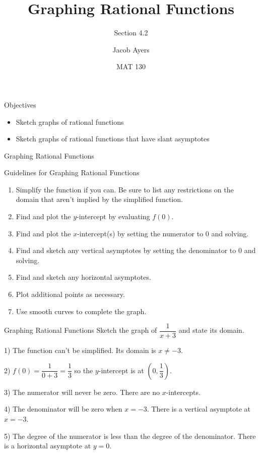 \documentclass[t, aspectratio=169]{beamer}
\title[4.2]{Graphing Rational Functions}
\subtitle{Section 4.2}
\author{Jacob Ayers}
\institute{Lesson \#16}
\date{MAT 130}
\newcommand{\fp}[1]{\left({#1}\right)} %
\begin{document}
	
	\begin{frame}
		\titlepage
	\end{frame}
	
	\begin{frame}{Objectives}
		\begin{itemize}
			\item Sketch graphs of rational functions
			\item Sketch graphs of rational functions that have slant asymptotes
		\end{itemize}
	\end{frame}
	
	\begin{frame}{Graphing Rational Functions}
		\begin{block}{Guidelines for Graphing Rational Functions}
			\begin{enumerate}[1)]
				\item Simplify the function if you can. Be sure to list any restrictions on the domain that aren't implied by the simplified function. \pause
				\item Find and plot the $y$-intercept by evaluating $f(0)$. \pause
				\item Find and plot the $x$-intercept(s) by setting the numerator to $0$ and solving. \pause
				\item Find and sketch any vertical asymptotes by setting the denominator to $0$ and solving. \pause
				\item Find and sketch any horizontal asymptotes. \pause
				\item Plot additional points as necessary. \pause
				\item Use smooth curves to complete the graph.
			\end{enumerate}
		\end{block}
	\end{frame}

	\begin{frame}{Graphing Rational Functions}
		Sketch the graph of $\dfrac{1}{x+3}$ and state its domain. \pause
		
		1) The function can't be simplified. Its domain is $x \neq -3$. \pause
		
		2) $f(0) = \dfrac{1}{0+3} = \dfrac13$ so the $y$-intercept is at $\fp{0,\dfrac13}$. \pause
		
		3) The numerator will never be zero. There are no $x$-intercepts. \pause
		
		4) The denominator will be zero when $x = -3$. There is a vertical asymptote at $x = -3$. \pause
		
		5) The degree of the numerator is less than the degree of the denominator. There is a horizontal asymptote at $y = 0$.
	\end{frame}
\end{document}
